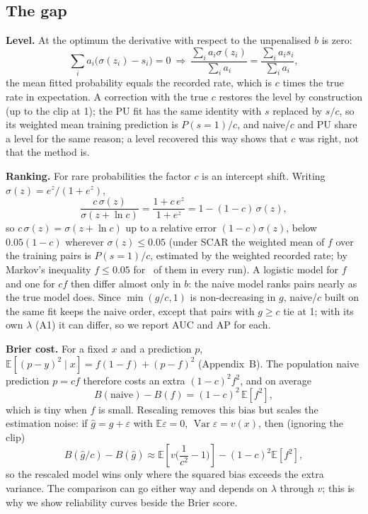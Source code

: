 \documentclass[conference]{IEEEtran}
\newcommand{\E}{\mathbb{E}}
\begin{document}
\subsection{The gap}
\textbf{Level.} At the optimum the derivative with respect to the unpenalised $b$ is zero:
\begin{equation}
\sum_i a_i\big(\sigma(z_i)-s_i\big)=0\ \Rightarrow\ \frac{\sum_i a_i\sigma(z_i)}{\sum_i a_i}=\frac{\sum_i a_i s_i}{\sum_i a_i},\label{eq:level}
\end{equation}
the mean fitted probability equals the recorded rate, which is $c$ times the true rate in expectation. A correction with the true $c$ restores the level by construction (up to the clip at 1); the PU fit has the same identity with $s$ replaced by $s/c$, so its weighted mean training prediction is $P(s=1)/c$, and naive/$c$ and PU share a level for the same reason; a level recovered this way shows that $c$ was right, not that the method is.

\textbf{Ranking.} For rare probabilities the factor $c$ is an intercept shift. Writing $\sigma(z)=e^z/(1+e^z)$,
\begin{equation}
\frac{c\,\sigma(z)}{\sigma(z+\ln c)}=\frac{1+c\,e^z}{1+e^z}=1-(1-c)\,\sigma(z),\label{eq:shift}
\end{equation}
so $c\,\sigma(z)=\sigma(z+\ln c)$ up to a relative error $(1-c)\sigma(z)$, below $0.05(1-c)$ wherever $\sigma(z)\le0.05$ (under SCAR the weighted mean of $f$ over the training pairs is $P(s=1)/c$, estimated by the weighted recorded rate; by Markov's inequality $f\le0.05$ for \PairsBelowFive\ of them in every run). A logistic model for $f$ and one for $cf$ then differ almost only in $b$: the naive model ranks pairs nearly as the true model does. Since $\min(g/c,1)$ is non-decreasing in $g$, naive/$c$ built on the same fit keeps the naive order, except that pairs with $g\ge c$ tie at 1; with its own $\lambda$ (A1) it can differ, so we report AUC and AP for each.

\textbf{Brier cost.} For a fixed $x$ and a prediction $p$, $\E[(p-y)^2\mid x]=f(1-f)+(p-f)^2$ (Appendix~B). The population naive prediction $p=cf$ therefore costs an extra $(1-c)^2 f^2$, and on average
\begin{equation}
B(\text{naive})-B(f)=(1-c)^2\,\E[f^2],
\end{equation}
which is tiny when $f$ is small. Rescaling removes this bias but scales the estimation noise: if $\hat g=g+\varepsilon$ with $\E\varepsilon=0$, $\operatorname{Var}\varepsilon=v(x)$, then (ignoring the clip)
\begin{equation}
B(\hat g/c)-B(\hat g)\approx\E\!\left[v\Big(\frac1{c^2}-1\Big)\right]-(1-c)^2\E[f^2],\label{eq:tradeoff}
\end{equation}
so the rescaled model wins only where the squared bias exceeds the extra variance. The comparison can go either way and depends on $\lambda$ through $v$; this is why we show reliability curves beside the Brier score.
\end{document}
